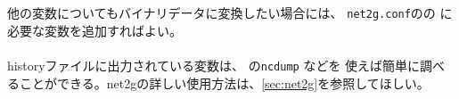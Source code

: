 他の変数についてもバイナリデータに変換したい場合には、
\verb|net2g.conf|のの に必要な変数を追加すればよい。\\

\\

\noindent
historyファイルに出力されている変数は、{\netcdf} の\verb|ncdump| などを
使えば簡単に調べることができる。net2gの詳しい使用方法は、\ref{sec:net2g}を参照してほしい。






